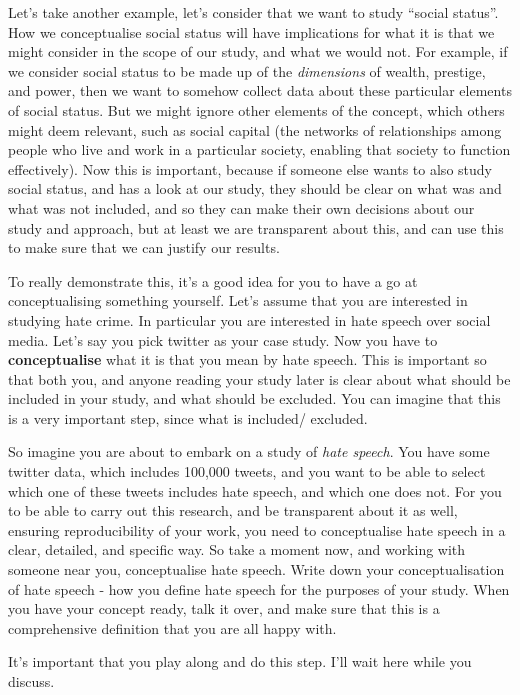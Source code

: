 \documentclass[]{book}
\theoremstyle{definition}
\theoremstyle{definition}
\theoremstyle{definition}
\theoremstyle{remark}
\begin{document}
Let's take another example, let's consider that we want to study
``social status''. How we conceptualise social status will have
implications for what it is that we might consider in the scope of our
study, and what we would not. For example, if we consider social status
to be made up of the \emph{dimensions} of wealth, prestige, and power,
then we want to somehow collect data about these particular elements of
social status. But we might ignore other elements of the concept, which
others might deem relevant, such as social capital (the networks of
relationships among people who live and work in a particular society,
enabling that society to function effectively). Now this is important,
because if someone else wants to also study social status, and has a
look at our study, they should be clear on what was and what was not
included, and so they can make their own decisions about our study and
approach, but at least we are transparent about this, and can use this
to make sure that we can justify our results.

To really demonstrate this, it's a good idea for you to have a go at
conceptualising something yourself. Let's assume that you are interested
in studying hate crime. In particular you are interested in hate speech
over social media. Let's say you pick twitter as your case study. Now
you have to \textbf{conceptualise} what it is that you mean by hate
speech. This is important so that both you, and anyone reading your
study later is clear about what should be included in your study, and
what should be excluded. You can imagine that this is a very important
step, since what is included/ excluded.

So imagine you are about to embark on a study of \emph{hate speech}. You
have some twitter data, which includes 100,000 tweets, and you want to
be able to select which one of these tweets includes hate speech, and
which one does not. For you to be able to carry out this research, and
be transparent about it as well, ensuring reproducibility of your work,
you need to conceptualise hate speech in a clear, detailed, and specific
way. So take a moment now, and working with someone near you,
conceptualise hate speech. Write down your conceptualisation of hate
speech - how you define hate speech for the purposes of your study. When
you have your concept ready, talk it over, and make sure that this is a
comprehensive definition that you are all happy with.

It's important that you play along and do this step. I'll wait here
while you discuss.
\end{document}
